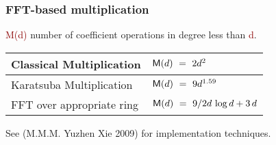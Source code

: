 \begin{frame}
\frametitle{FFT-based multiplication}

\textcolor{darkred}{M(d)}  number of coefficient operations in degree less than  \textcolor{darkred}{d}.

\begin{tabular}[t]{|l|l|}
\hline
Classical Multiplication & \textcolor{darkred}{$\mathsf{M}(d)~=~2d^2$}\\
\hline
Karatsuba Multiplication & \textcolor{darkred}{$\mathsf{M}(d)~=~9d^{1.59}$} \\
\hline
FFT over appropriate ring & \textcolor{darkred}{$\mathsf{M}(d)~=~9/2 d\,\log d + 3 \, d$} \\  \hline
\end{tabular}

\bigskip 

See (M.M.M. Yuzhen Xie 2009) for implementation techniques.

\end{frame}

